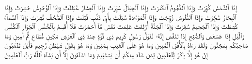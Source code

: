 إِذَا ٱلشَّمۡسُ كُوِّرَتۡ
وَإِذَا ٱلنُّجُومُ ٱنكَدَرَتۡ
وَإِذَا ٱلۡجِبَالُ سُيِّرَتۡ
وَإِذَا ٱلۡعِشَارُ عُطِّلَتۡ
وَإِذَا ٱلۡوُحُوشُ حُشِرَتۡ
وَإِذَا ٱلۡبِحَارُ سُجِّرَتۡ
وَإِذَا ٱلنُّفُوسُ زُوِّجَتۡ
وَإِذَا ٱلۡمَوۡءُۥدَةُ سُئِلَتۡ
بِأَيِّ ذَنۢبٖ قُتِلَتۡ
وَإِذَا ٱلصُّحُفُ نُشِرَتۡ
وَإِذَا ٱلسَّمَآءُ كُشِطَتۡ
وَإِذَا ٱلۡجَحِيمُ سُعِّرَتۡ
وَإِذَا ٱلۡجَنَّةُ أُزۡلِفَتۡ
عَلِمَتۡ نَفۡسٞ مَّآ أَحۡضَرَتۡ
فَلَآ أُقۡسِمُ بِٱلۡخُنَّسِ
ٱلۡجَوَارِ ٱلۡكُنَّسِ
وَٱلَّيۡلِ إِذَا عَسۡعَسَ
وَٱلصُّبۡحِ إِذَا تَنَفَّسَ
إِنَّهُۥ لَقَوۡلُ رَسُولٖ كَرِيمٖ
ذِي قُوَّةٍ عِندَ ذِي ٱلۡعَرۡشِ مَكِينٖ
مُّطَاعٖ ثَمَّ أَمِينٖ
وَمَا صَاحِبُكُم بِمَجۡنُونٖ
وَلَقَدۡ رَءَاهُ بِٱلۡأُفُقِ ٱلۡمُبِينِ
وَمَا هُوَ عَلَى ٱلۡغَيۡبِ بِضَنِينٖ
وَمَا هُوَ بِقَوۡلِ شَيۡطَٰنٖ رَّجِيمٖ
فَأَيۡنَ تَذۡهَبُونَ
إِنۡ هُوَ إِلَّا ذِكۡرٞ لِّلۡعَٰلَمِينَ
لِمَن شَآءَ مِنكُمۡ أَن يَسۡتَقِيمَ
وَمَا تَشَآءُونَ إِلَّآ أَن يَشَآءَ ٱللَّهُ رَبُّ ٱلۡعَٰلَمِينَ